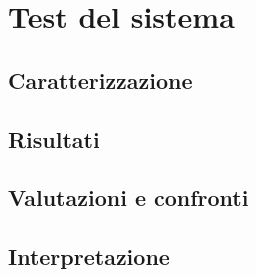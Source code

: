 \section{Test del sistema}

\subsection{Caratterizzazione}





\subsection{Risultati}


\subsection{Valutazioni e confronti}




\subsection{Interpretazione}